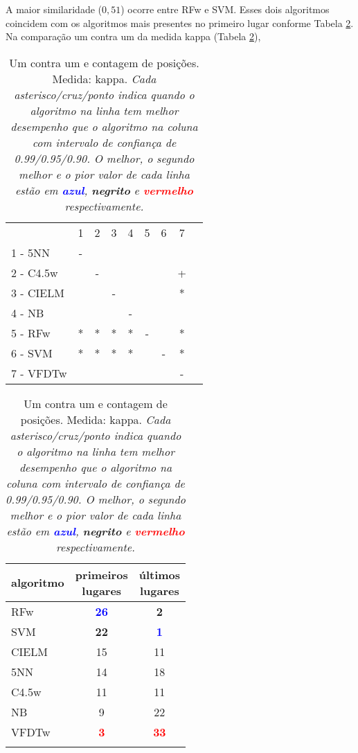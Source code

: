 A maior similaridade ($0,51$) ocorre entre RFw e SVM.
Esses dois algoritmos coincidem com os algoritmos mais presentes no primeiro lugar
conforme Tabela \ref{tab:friedClassif}.
Na comparação um contra um da medida kappa (Tabela \ref{tab:friedClassif}),
\begin{table}[h]
\caption{Um contra um e contagem de posições.
Medida: kappa.
\textit{Cada asterisco/cruz/ponto indica quando o algoritmo na linha tem melhor
desempenho que o algoritmo na coluna com intervalo de confiança de 0.99/0.95/0.90.
O melhor, o segundo melhor e o pior valor de cada linha
estão em \textcolor{blue}{\textbf{azul}}, \textbf{negrito} e
\textcolor{red}{\textbf{vermelho}} respectivamente.}}
\begin{center}
\begin{tabular}{lcc|cc|cc|cc}
                        & 1 & 2 & 3 & 4 & 5 & 6 & 7\\
1 - 5NN         & - &   &   &   &   &   &   \\
2 - C4.5w       &   & - &   &   &   &   & + \\ \hline
3 - CIELM       &   &   & - &   &   &   & * \\
4 - NB          &   &   &   & - &   &   &   \\ \hline
5 - RFw         & * & * & * & * & - &   & * \\
6 - SVM         & * & * & * & * &   & - & * \\ \hline
7 - VFDTw       &   &   &   &   &   &   & - \\
\end{tabular}
\quad
\begin{tabular}{lcc}
algoritmo & \makecell{primeiros\\lugares} & \makecell{últimos\\lugares} \\
\hline
RFw        &    \textcolor{blue}{\textbf{26}}       &              \textbf{2}       \\
SVM        &    \textbf{22}       &              \textcolor{blue}{\textbf{1}}       \\
CIELM      &    15       &              11      \\
5NN        &    14       &              18      \\
C4.5w      &    11       &              11      \\
NB         &    9        &              22      \\
VFDTw      &    \textcolor{red}{\textbf{3}}        &              \textcolor{red}{\textbf{33}}      \\
\label{tab:friedClassif}
\end{tabular}
\end{center}
\end{table}
